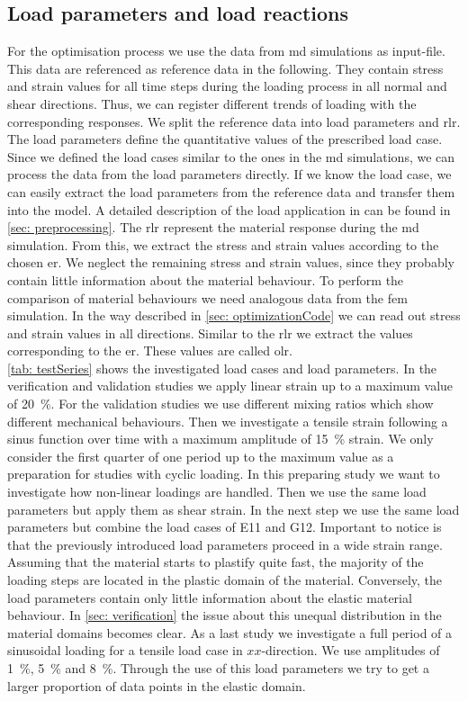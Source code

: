 \subsection{Load parameters and load reactions}\label{subsec:loadParameters}
For the optimisation process we use the data from \acrshort{md} simulations as input-file. This data are referenced as reference data in the following. They contain stress and strain values for all time steps during the loading process in all normal and shear directions. Thus, we can register different trends of loading with the corresponding responses.
We split the reference data into load parameters and \acrlong{rlr}. The load parameters define the quantitative values of the prescribed load case. 
Since we defined the load cases similar to the ones in the \acrshort{md} simulations, we can process the data from the load parameters directly.  If we know the load case, we can easily extract the load parameters from the reference data and transfer them into the  model. A detailed description of the load application in  can be found in \autoref{sec: preprocessing}. 
The \acrlong{rlr} represent the material response during the \acrshort{md} simulation. From this, we extract the stress and strain values according to the chosen \acrlong{er}. We neglect the remaining stress and strain values, since they probably contain little information about the material behaviour.
To perform the comparison of material behaviours we need analogous data from the \acrshort{fem} simulation. In the way described in \autoref{sec: optimizationCode} we can read out stress and strain values in all directions. Similar to the \acrlong{rlr} we extract the values corresponding to the \acrlong{er}. These values are called \acrlong{olr}. \\
\autoref{tab: testSeries} shows the investigated load cases and load parameters.
In the verification and validation studies we apply linear strain up to a maximum value of 20 \%. For the validation studies we use different mixing ratios which show different mechanical behaviours. Then we investigate a tensile strain following a sinus function over time with a maximum amplitude of 15 \% strain. We only consider the first quarter of one period up to the maximum value as a preparation for studies with cyclic loading. In this preparing study we want to investigate how non-linear loadings are handled. Then we use the same load parameters but apply them as shear strain. In the next step we use the same load parameters but combine the load cases of E11 and G12. Important to notice is that the previously introduced load parameters proceed in a wide strain range. Assuming that the material starts to plastify quite fast, the majority of the loading steps are located in the plastic domain of the material. Conversely, the load parameters contain only little information about the elastic material behaviour. In \autoref{sec: verification} the issue about this unequal distribution in the material domains becomes clear.    
As a last study we investigate  a full period of a sinusoidal loading for a tensile load case in $xx$-direction. We use amplitudes of 1 \%, 5 \% and 8 \%. Through the use of this load parameters we try to get a larger proportion of data points in the elastic domain.

